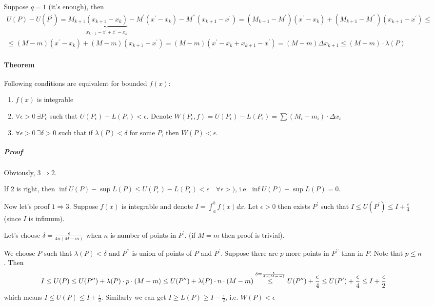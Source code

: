 Suppose $q=1$ (it's enough), then
\begin{align*}
U(P) - U(P^\prime) = M_{k+1} \underbrace{\left( x_{k+1} - x_k \right)}_{x_{k+1}-x^\prime + x^\prime - x_k} - M^\prime \left( x^\prime - x_k \right) - M^{\prime \prime} \left( x_{k+1} - x^\prime \right) = \left(M_{k+1} - M^\prime\right)\left( x^\prime - x_k \right) +  \left(M_{k+1} - M^{\prime\prime}\right)\left( x_{k+1} - x^\prime \right) \leq\\
\leq (M-m)(x^\prime-x_k)+(M-m)(x_{k+1}-x^\prime) = (M-m)(x^\prime - x_k + x_{k+1}-x^\prime) = (M-m)\Delta x_{k+1} \leq (M-m) \cdot \lambda(P)
\end{align*}
\paragraph{Theorem} Following conditions are equivalent for bounded $f(x)$:
\begin{enumerate}
	\item $f(x)$ is integrable
	\item $\forall \epsilon > 0 \: \exists P_\epsilon$ such that $U(P_\epsilon) - L(P_\epsilon) < \epsilon$. Denote $W(P_\epsilon, f) = U(P_\epsilon) - L(P_\epsilon) = \sum \left(M_i - m_i\right) \cdot \Delta x_i$
	\item $\forall \epsilon > 0 \: \exists \delta > 0 $ such that if $\lambda(P) < \delta$ for some $P$, then $W(P) < \epsilon$.
\end{enumerate}
\subparagraph{Proof} Obviously, $3 \Rightarrow 2$.

If 2 is right, then $\inf U(P) - \sup L(P) \leq U(P_\epsilon) - L(P_\epsilon) < \epsilon \quad \forall \epsilon > )$, i.e. $\inf U(P) - \sup L(P) = 0$.

Now let's proof $1 \Rightarrow 3$. Suppose $f(x)$ is integrable and denote $I = \int_a^b f(x) dx$. Let $\epsilon > 0$ then exists $P^\prime$ such that $I \leq U(P^\prime) \leq I + \frac{\epsilon}{4}$ (since $I$ is infimum). 

Let's choose $\delta = \frac{\epsilon}{4n(M-m)}$ when $n$ is number of points in $P^\prime$. (if $M=m$ then proof is trivial).

We choose $P$ such that $\lambda(P) < \delta$ and $P^{\prime\prime}$ is union of points of $P$ and $P^\prime$. Suppose there are $p$ more points in $P^{\prime\prime}$ than in $P$. Note that $p \leq n$. Then
$$I \leq U(P) \leq U(P^{\prime \prime}) + \lambda(P)\cdot p\cdot(M-m) \leq U(P^{\prime \prime}) + \lambda(P) \cdot n \cdot (M-m) \stackrel{\scriptsize \delta = \frac{\epsilon}{4n(M-m)}}{\leq} U(P^{\prime \prime})  + \frac{\epsilon}{4} \leq U(P^\prime)  + \frac{\epsilon}{4} \leq I + \frac{\epsilon}{2} $$
which means $I \leq U(P) \leq I+\frac{\epsilon}{2}$. Similarly we can get $I \geq L(P) \geq I-\frac{\epsilon}{2}$, i.e. $W(P) < \epsilon$